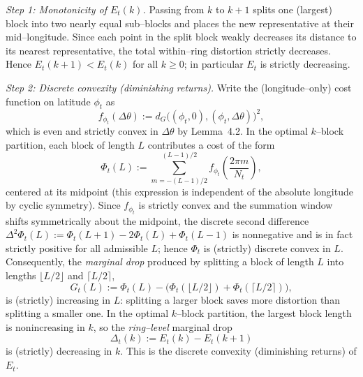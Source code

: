 \documentclass[12pt, reqno]{amsart}
\theoremstyle{plain}
\theoremstyle{definition}
\begin{document}
\smallskip
\emph{Step 1: Monotonicity of $E_t(k)$.}
Passing from $k$ to $k{+}1$ splits one (largest) block into two nearly equal sub–blocks and places the new representative at their mid–longitude. Since each point in the split block weakly decreases its distance to its nearest representative, the total within–ring distortion strictly decreases. Hence $E_t(k{+}1)<E_t(k)$ for all $k\ge 0$; in particular $E_t$ is strictly decreasing.

\smallskip
\emph{Step 2: Discrete convexity (diminishing returns).}
Write the (longitude–only) cost function on latitude $\phi_t$ as
\[
f_{\phi_t}(\Delta\theta)
:=d_G\big((\phi_t,0),(\phi_t,\Delta\theta)\big)^2,
\]
which is even and strictly convex in $\Delta\theta$ by Lemma~4.2. In the optimal $k$–block partition, each block of length $L$ contributes a cost of the form
\[
\Phi_t(L)
:=\sum_{m=-(L-1)/2}^{(L-1)/2}
f_{\phi_t}\!\left(\frac{2\pi m}{N_t}\right),
\]
centered at its midpoint (this expression is independent of the absolute longitude by cyclic symmetry). Since $f_{\phi_t}$ is strictly convex and the summation window shifts symmetrically about the midpoint, the discrete second difference $\Delta^2\Phi_t(L):=\Phi_t(L{+}1)-2\Phi_t(L)+\Phi_t(L{-}1)$ is nonnegative and is in fact strictly positive for all admissible $L$; hence $\Phi_t$ is (strictly) discrete convex in $L$.
Consequently, the \emph{marginal drop} produced by splitting a block of length $L$ into lengths $\lfloor L/2\rfloor$ and $\lceil L/2\rceil$,
\[
G_t(L):=\Phi_t(L)-\Big(\Phi_t(\lfloor L/2\rfloor)+\Phi_t(\lceil L/2\rceil)\Big),
\]
is (strictly) increasing in $L$: splitting a larger block saves more distortion than splitting a smaller one. In the optimal $k$–block partition, the largest block length is nonincreasing in $k$, so the \emph{ring–level} marginal drop
\[
\Delta_t(k):=E_t(k)-E_t(k{+}1)
\]
is (strictly) decreasing in $k$. This is the discrete convexity (diminishing returns) of $E_t$. 
\end{document}
